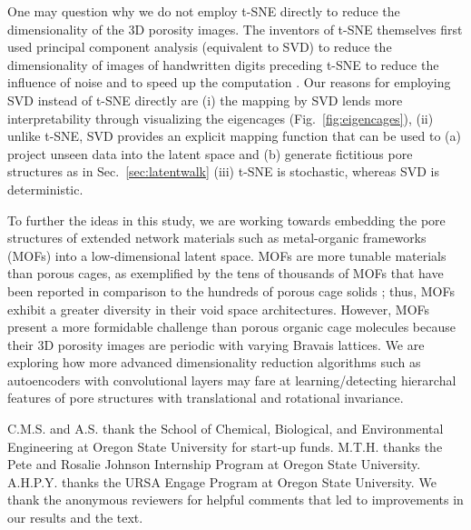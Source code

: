 \documentclass[journal=jacsat,manuscript=article,layout=traditional]{achemso}
\begin{document}
{\color{red} One may question why we do not employ t-SNE \cite{maaten2008visualizing} directly to reduce the dimensionality of the 3D porosity images. The inventors of t-SNE themselves first used principal component analysis (equivalent to SVD) to reduce the dimensionality of images of handwritten digits preceding t-SNE to reduce the influence of noise and to speed up the computation \cite{maaten2008visualizing}. Our reasons for employing SVD instead of t-SNE directly are (i) the mapping by SVD lends more interpretability through visualizing the eigencages (Fig.~\ref{fig:eigencages}), (ii) unlike t-SNE, SVD provides an explicit mapping function that can be used to (a) project unseen data into the latent space and (b) generate fictitious pore structures as in Sec.~\ref{sec:latentwalk} (iii) t-SNE is stochastic, whereas SVD is deterministic. 
}

To further the ideas in this study, we are working towards embedding the pore structures of extended network materials such as metal-organic frameworks (MOFs) into a low-dimensional latent space. MOFs are more tunable materials than porous cages, as exemplified by the tens of thousands of MOFs that have been reported \cite{moghadam2017development} in comparison to the hundreds of porous cage solids \cite{evans2016computational}; thus, MOFs exhibit a greater diversity in their void space architectures. However, MOFs present a more formidable challenge than porous organic cage molecules because their 3D porosity images are periodic with varying Bravais lattices. We are exploring how more advanced dimensionality reduction algorithms such as autoencoders \cite{hinton2006reducing} with convolutional layers \cite{kavukcuoglu2010learning,zeiler2010deconvolutional} may fare at learning/detecting hierarchal features of pore structures with translational and rotational invariance.

\begin{acknowledgement}


C.M.S. and A.S. thank the School of Chemical, Biological, and Environmental Engineering at Oregon State University for start-up funds. M.T.H. thanks the Pete and Rosalie Johnson Internship Program at Oregon State University. A.H.P.Y. thanks the URSA Engage Program at Oregon State University. {\color{red} We thank the anonymous reviewers for helpful comments that led to improvements in our results and the text.}

\end{acknowledgement}
\end{document}
